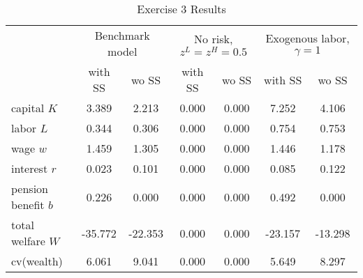 
    \begin{table}\caption{Exercise 3 Results}
\centering
    \begin{tabular}{lcccccc}
    \toprule
    	& \multicolumn{2}{c}{Benchmark model} & \multicolumn{2}{c}{No risk, $z^L = z^H = 0.5$} & \multicolumn{2}{c}{Exogenous labor, $\gamma = 1$} \\ 
    	\cmidrule(lr){2-3}\cmidrule(lr){4-5}\cmidrule(lr){6-7}
    	& with SS & wo SS & with SS & wo SS & with SS & wo SS\\
    \midrule
	capital $K$ & 3.389 & 2.213 & 0.000 & 0.000 & 7.252 & 4.106\\
	labor $L$ & 0.344 & 0.306 & 0.000 & 0.000 & 0.754 & 0.753\\
	wage $w$ & 1.459 & 1.305 & 0.000 & 0.000 & 1.446 & 1.178\\
	interest $r$ & 0.023 & 0.101 & 0.000 & 0.000 & 0.085 & 0.122\\
	pension benefit $b$ & 0.226 & 0.000 & 0.000 & 0.000 & 0.492 & 0.000\\
	total welfare $W$ & -35.772 & -22.353 & 0.000 & 0.000 & -23.157 & -13.298\\
	cv(wealth) & 6.061 & 9.041 & 0.000 & 0.000 & 5.649 & 8.297\\

    \bottomrule
    \end{tabular}
    \end{table}